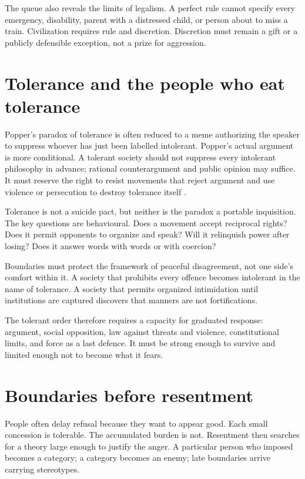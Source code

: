 \documentclass[12pt,a4paper]{book}
\begin{document}
The queue also reveals the limits of legalism.  A perfect rule cannot specify
every emergency, disability, parent with a distressed child, or person about to
miss a train.  Civilization requires rule and discretion.  Discretion must
remain a gift or a publicly defensible exception, not a prize for aggression.

\section{Tolerance and the people who eat tolerance}

Popper's paradox of tolerance is often reduced to a meme authorizing the
speaker to suppress whoever has just been labelled intolerant.  Popper's actual
argument is more conditional.  A tolerant society should not suppress every
intolerant philosophy in advance; rational counterargument and public opinion
may suffice.  It must reserve the right to resist movements that reject
argument and use violence or persecution to destroy tolerance itself
\cite[vol.~I, ch.~7, note~4]{Popper-TOSAIE}.

Tolerance is not a suicide pact, but neither is the paradox a portable
inquisition.  The key questions are behavioural.  Does a movement accept
reciprocal rights?  Does it permit opponents to organize and speak?  Will it
relinquish power after losing?  Does it answer words with words or with
coercion?

Boundaries must protect the framework of peaceful disagreement, not one side's
comfort within it.  A society that prohibits every offence becomes intolerant
in the name of tolerance.  A society that permits organized intimidation until
institutions are captured discovers that manners are not fortifications.

The tolerant order therefore requires a capacity for graduated response:
argument, social opposition, law against threats and violence, constitutional
limits, and force as a last defence.  It must be strong enough to survive and
limited enough not to become what it fears.

\section{Boundaries before resentment}

People often delay refusal because they want to appear good.  Each small
concession is tolerable.  The accumulated burden is not.  Resentment then
searches for a theory large enough to justify the anger.  A particular person
who imposed becomes a category; a category becomes an enemy; late boundaries
arrive carrying stereotypes.
\end{document}

